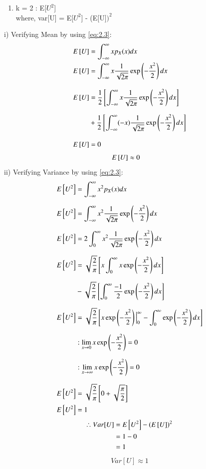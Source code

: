 \documentclass[journal,12pt,twocolumn]{IEEEtran}
\renewcommand\thesection{\arabic{section}}
\begin{document}
\begin{enumerate}[label=\textbf{\thesection.\arabic*},ref=\thesection.\theenumi]
\begin{enumerate}
   		\item k = 2 : E[$U^2$] \\[9pt]
    		where, var[U] = E[$U^2$] - (E[U$])^2$\\
	\end{enumerate}
i) Verifying Mean by using \eqref{eq:2.3}:
    \begin{align*}
    		E{}\left[U\right] &= \int_{-\infty}^{\infty} x p_X(x)dx\\
    		E{}\left[U\right] &= \int_{-\infty}^{\infty} x \frac{1} {\sqrt{2\pi}} \exp\left(-\frac{x^2}{2}\right) dx \\[9pt]
   		E{}\left[U\right] &= \dfrac{1}{2} {}\left[ \int_{-\infty}^{\infty} x \frac{1} {\sqrt{2\pi}} \exp\left(-\frac{x^2}{2}\right) dx\right] \\[7pt] &+ \dfrac{1}{2} {}\left[\int_{-\infty}^{\infty} (-x) \frac{1}{\sqrt{2\pi}} \exp\left(-\frac{x^2}{2}\right) dx\right]\\[9pt]
   		E{}\left[U\right] &= 0
    \end{align*}
%
	\begin{align}
        E{}\left[U\right] &\approx 0
	\end{align}
%
ii) Verifying Variance by using \eqref{eq:2.3}:
	\begin{align*}
    	 E{}\left[U^2\right] &= \int_{-\infty}^{\infty} x^2 p_X(x) dx\\[7pt]
    	 E{}\left[U^2\right] &= \int_{-\infty}^{\infty} x^2 \frac{1}{\sqrt{2\pi}}\exp\left(-\frac{x^2}{2}\right) dx \\[7pt]
     E{}\left[U^2\right] &= 2\int_{0}^{\infty} x^2 \frac{1}{\sqrt{2\pi}}\exp\left(-\frac{x^2}{2}\right) dx \\[7pt]
     E{}\left[U^2\right] &= \sqrt{\frac{2}{\pi}} {}\left[ x \int_{0}^{\infty} x \exp\left(-\frac{x^2}{2}\right)dx\right]\\[7pt] &- \sqrt{\frac{2}{\pi}} {}\left[\int_{0}^{\infty} {\dfrac{-1}{2}}\exp\left(-\frac{x^2}{2}\right)dx\right]\\[7pt]
     E{}\left[U^2\right] &= \sqrt{\frac{2}{\pi}} {}\left[x \exp\left(-\frac{x^2}{2}\right) \Big|_{0}^{\infty} - \int_{0}^{\infty}\exp\left( -\frac{x^2}{2}\right) dx\right]\\[7pt]
    &: \lim_{x \to 0} x \exp\left(-\frac{x^2}{2}\right) = 0 \\[7pt]
     &: \lim_{x \to \infty} x \exp\left(-\frac{x^2}{2}\right) = 0 \\[7pt]
     E{}\left[U^2\right] &= \sqrt{\frac{2}{\pi}} {}\left[0 + \sqrt{\frac{\pi}{2}}\right]\\
     E{}\left[U^2\right] &= 1
     \end{align*}	
%	
	\begin{align*}
        \therefore Var[U] &=  E{}\left[U^2\right] -  (E{}\left[U\right])^2\\
        &= 1 - 0\\
        &=1
	\end{align*}
%	
	\begin{align}
    		Var[U] \approx 1
	\end{align}
\end{enumerate}
\end{document}
